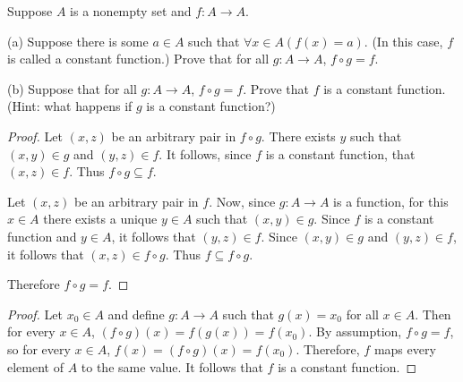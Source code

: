 \begin{tcolorbox}[title=Problem 17, breakable]
    Suppose $A$ is a nonempty set and $f : A \rightarrow A$.

    (a) Suppose there is some $a \in A$ such that 
        $\forall{x} \in A(f(x) = a)$. (In this case, $f$ is called 
        a constant function.) Prove that for all $g : A \rightarrow A$,
        $f \circ g  = f$.

    (b) Suppose that for all $g : A \rightarrow A$, $f \circ g = f$.
        Prove that $f$ is a constant function. (Hint: what happens
        if $g$ is a constant function?)
\end{tcolorbox}

\begin{proof}
    Let $(x, z)$ be an arbitrary pair in $f \circ g$.
    There exists $y$ such that $(x, y) \in g$ and $(y, z) \in f$.
    It follows, since $f$ is a constant function, that $(x, z) \in f$.
    Thus $f \circ g \subseteq f$.

    Let $(x, z)$ be an arbitrary pair in $f$.
    Now, since $g : A \rightarrow A$ is a function, for this $x \in A$
        there exists a unique $y \in A$ such that $(x, y) \in g$.
    Since $f$ is a constant function and $y \in A$,
        it follows that $(y, z) \in f$.
    Since $(x, y) \in g$ and $(y, z) \in f$, 
        it follows that $(x, z) \in f \circ g$.
    Thus $f \subseteq f \circ g$.

    Therefore $f \circ g = f$.
\end{proof}

\begin{proof}
    Let $x_0 \in A$ and define 
        $g : A \to A$ such that $g(x) = x_0$ for all $x \in A$.
    Then for every $x \in A$, $(f \circ g)(x) = f(g(x)) = f(x_0)$.
    By assumption, $f \circ g = f$, so for every $x \in A$, $f(x) = (f \circ g)(x) = f(x_0)$.
    Therefore, $f$ maps every element of $A$ to the same value.
    It follows that $f$ is a constant function.
\end{proof}

